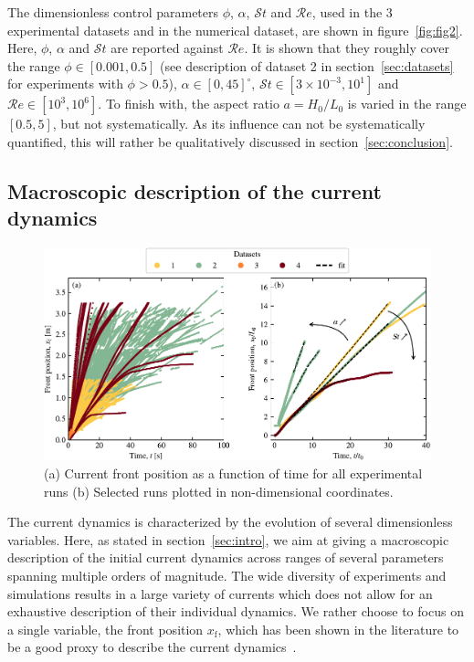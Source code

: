 \documentclass[12pt]{article}
\begin{document}
The dimensionless control parameters $\phi$, $\alpha$, $\mathcal{S}t$ and $\mathcal{R}e$, used in the 3 experimental datasets and in the numerical dataset, are shown in figure~\ref{fig:fig2}. Here, $\phi$, $\alpha$ and $\mathcal{S}t$ are reported against $\mathcal{R}e$. It is shown that they roughly cover the range $\phi \in [0.001, 0.5]$ (see description of dataset 2 in section~\ref{sec:datasets} for experiments with $\phi > 0.5$), $\alpha \in [0,45]^\circ$, $\mathcal{S}t \in [3{\times}10^{-3}, 10^{1}]$ and $\mathcal{R}e \in [10^3, 10^6]$. To finish with, the aspect ratio $a=H_0/L_0$ is varied in the range $[0.5, 5]$, but not systematically. As its influence can not be systematically quantified, this will rather be qualitatively discussed in section~\ref{sec:conclusion}.

\subsection{Macroscopic description of the current dynamics}

\begin{figure}[ht]
	\centering
	\includegraphics{figure3.pdf}
	\caption{(a) Current front position as a function of time for all experimental runs (b) Selected runs plotted in non-dimensional coordinates.}
	\label{fig:fig3}
\end{figure}

The current dynamics is characterized by the evolution of several dimensionless variables. Here, as stated in section~\ref{sec:intro}, we aim at giving a macroscopic description of the initial current dynamics across ranges of several parameters spanning multiple orders of magnitude. The wide diversity of experiments and simulations results in a large variety of currents which does not allow for an exhaustive description of their individual dynamics. We rather choose to focus on a single variable, the front position $x_{\text{f}}$, which has been shown in the literature to be a good proxy to describe the current dynamics~\citep[e.g.][]{bonnecaze1993particle, Chowdhury2011, Adduce2012}.
\end{document}
